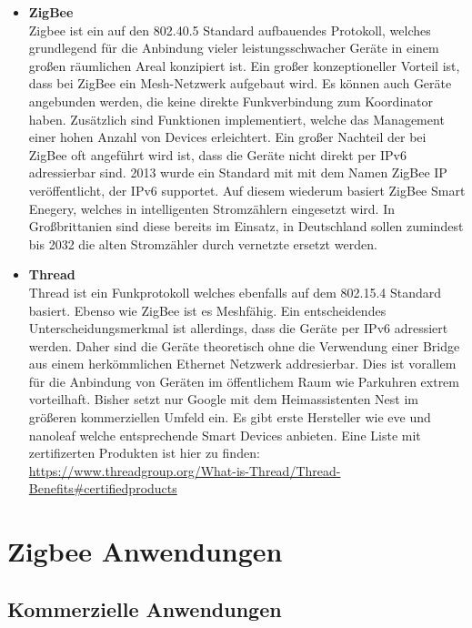 \begin{itemize}
    \item \textbf{ZigBee}\\
    Zigbee \cite{zigbee} ist ein auf den 802.40.5 Standard aufbauendes Protokoll, welches grundlegend für die Anbindung vieler leistungsschwacher
    Geräte in einem großen räumlichen Areal konzipiert ist. Ein großer konzeptioneller Vorteil ist, dass bei 
    ZigBee ein Mesh-Netzwerk aufgebaut wird. Es können auch Geräte angebunden werden, die keine direkte Funkverbindung
    zum Koordinator haben. Zusätzlich sind Funktionen implementiert, welche das Management einer hohen Anzahl von Devices
    erleichtert. Ein großer Nachteil der bei ZigBee oft angeführt wird ist, dass die Geräte nicht direkt per IPv6 adressierbar sind. 2013 wurde 
    ein Standard mit mit dem Namen \grqq ZigBee IP\grqq{} veröffentlicht, der IPv6 supportet. Auf diesem wiederum basiert ZigBee Smart Enegery, welches in 
    intelligenten Stromzählern eingesetzt wird. In Großbrittanien sind diese bereits im Einsatz\cite{se}, in Deutschland sollen zumindest bis 2032 die alten Stromzähler 
    durch vernetzte ersetzt werden. \cite{bmwk}
    
    \item \textbf{Thread}\\
    Thread \cite{thread} ist ein Funkprotokoll welches ebenfalls auf dem 802.15.4 Standard basiert. Ebenso wie ZigBee ist es Meshfähig. Ein
    entscheidendes Unterscheidungsmerkmal ist allerdings, dass die Geräte per IPv6 adressiert werden. Daher sind die Geräte
    theoretisch ohne die Verwendung einer Bridge aus einem herkömmlichen Ethernet Netzwerk addresierbar. Dies ist vorallem für die Anbindung 
    von Geräten im öffentlichem Raum wie Parkuhren extrem vorteilhaft. Bisher setzt nur Google mit dem Heimassistenten Nest im größeren kommerziellen
    Umfeld ein. Es gibt erste Hersteller wie eve und nanoleaf welche entsprechende Smart Devices anbieten. Eine Liste mit zertifizerten Produkten ist 
    hier zu finden: \url{https://www.threadgroup.org/What-is-Thread/Thread-Benefits#certifiedproducts}
\end{itemize}

\section{Zigbee Anwendungen}

\subsection{Kommerzielle Anwendungen}

